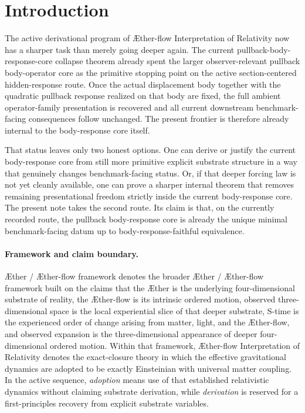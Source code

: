 \documentclass[11pt]{article}
\newcommand{\Aether}{\AE{}ther}
\newcommand{\Aflow}{\AE{}ther-flow}
\newcommand{\TheoryName}{\Aflow{} Interpretation of Relativity}
\newcommand{\TheoryProgram}{\Aether{} / \Aflow{} framework}
\begin{document}
\section{Introduction}

The active derivational program of \TheoryName{} now has a sharper task than merely going deeper again. The current pullback-body-response-core collapse theorem already spent the larger observer-relevant pullback body-operator core as the primitive stopping point on the active section-centered hidden-response route. Once the actual displacement body together with the quadratic pullback response realized on that body are fixed, the full ambient operator-family presentation is recovered and all current downstream benchmark-facing consequences follow unchanged. The present frontier is therefore already internal to the body-response core itself.

That status leaves only two honest options. One can derive or justify the current body-response core from still more primitive explicit substrate structure in a way that genuinely changes benchmark-facing status. Or, if that deeper forcing law is not yet cleanly available, one can prove a sharper internal theorem that removes remaining presentational freedom strictly inside the current body-response core. The present note takes the second route. Its claim is that, on the currently recorded route, the pullback body-response core is already the unique minimal benchmark-facing datum up to body-response-faithful equivalence.

\paragraph{Framework and claim boundary.}
\TheoryProgram{} denotes the broader \Aether{} / \Aflow{} framework built on the claims that the \Aether{} is the underlying four-dimensional substrate of reality, the \Aflow{} is its intrinsic ordered motion, observed three-dimensional space is the local experiential slice of that deeper substrate, S-time is the experienced order of change arising from matter, light, and the \Aflow{}, and observed expansion is the three-dimensional appearance of deeper four-dimensional ordered motion. Within that framework, \TheoryName{} denotes the exact-closure theory in which the effective gravitational dynamics are adopted to be exactly Einsteinian with universal matter coupling. In the active sequence, \emph{adoption} means use of that established relativistic dynamics without claiming substrate derivation, while \emph{derivation} is reserved for a first-principles recovery from explicit substrate variables.
\end{document}
